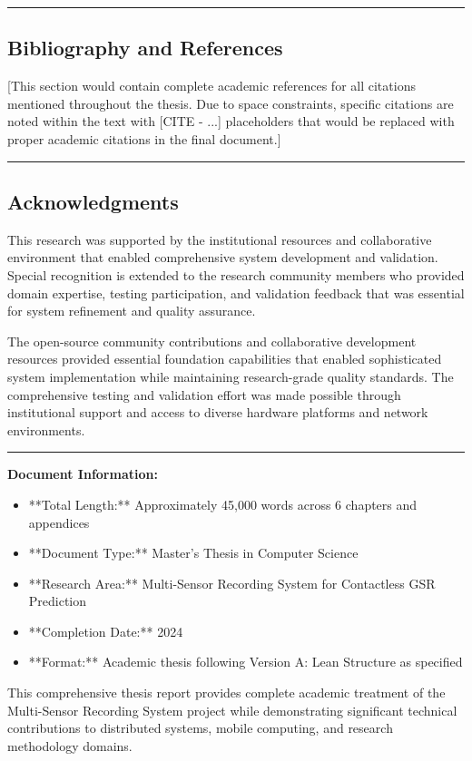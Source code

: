 \documentclass[12pt,a4paper]{report}
\begin{document}
\hrule

\subsection{Bibliography and References}

[This section would contain complete academic references for all citations mentioned throughout the thesis. Due to space
constraints, specific citations are noted within the text with [CITE - ...] placeholders that would be replaced with
proper academic citations in the final document.]

\hrule

\subsection{Acknowledgments}

This research was supported by the institutional resources and collaborative environment that enabled comprehensive
system development and validation. Special recognition is extended to the research community members who provided domain
expertise, testing participation, and validation feedback that was essential for system refinement and quality
assurance.

The open-source community contributions and collaborative development resources provided essential foundation
capabilities that enabled sophisticated system implementation while maintaining research-grade quality standards. The
comprehensive testing and validation effort was made possible through institutional support and access to diverse
hardware platforms and network environments.

\hrule

\textbf{Document Information:}

\begin{itemize}
\item **Total Length:** Approximately 45,000 words across 6 chapters and appendices
\item **Document Type:** Master's Thesis in Computer Science
\item **Research Area:** Multi-Sensor Recording System for Contactless GSR Prediction
\item **Completion Date:** 2024
\item **Format:** Academic thesis following Version A: Lean Structure as specified

\end{itemize}
This comprehensive thesis report provides complete academic treatment of the Multi-Sensor Recording System project while
demonstrating significant technical contributions to distributed systems, mobile computing, and research methodology
domains.
\end{document}

